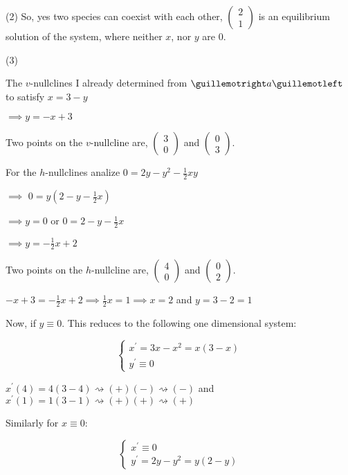 \documentclass{article}
\begin{document}
(2) So, yes two species can coexist with each other, $\begin{pmatrix}
  2\\1\end{pmatrix}$ is an equilibrium solution of the system, where
neither $x$, nor $y$ are $0$.

(3)

The $v$-nullclines I already determined from $\guillemotright a
\guillemotleft$ to satisfy $x = 3 -y$

$\implies y = -x + 3$

Two points on the $v$-nullcline are, $\begin{pmatrix} 3\\0\end{pmatrix}$ and $\begin{pmatrix} 0\\3\end{pmatrix}$.

For the $h$-nullclines analize  $0 = 2y -y^2 -\frac{1}{2}xy $

$\implies $ $0 = y(2 -y -\frac{1}{2}x)$

$\implies y = 0$ or $0 = 2 -y -\frac{1}{2}x$

$\implies y = -\frac{1}{2}x + 2$

Two points on the $h$-nullcline are, $\begin{pmatrix}
  4\\0\end{pmatrix}$ and $\begin{pmatrix} 0\\2\end{pmatrix}$.

$-x + 3 = -\frac{1}{2}x + 2 \implies \frac{1}{2}x =1 \implies x = 2$
and $y = 3-2 = 1$

Now, if $y \equiv 0$. This reduces to the following one dimensional system:

\[\begin{cases}
x^\prime = 3x -x^2 = x(3-x)\\
y^\prime \equiv 0
\end{cases}\]

$x^\prime(4) = 4(3-4)
\rightsquigarrow (+)(-)\rightsquigarrow (-)$
and
$x^\prime(1) = 1(3-1)
    \rightsquigarrow (+)(+)\rightsquigarrow (+)$

Similarly for $x \equiv 0$:

\[\begin{cases}
x^\prime \equiv 0\\
y^\prime = 2y -y^2 = y(2-y)
\end{cases}\]
\end{document}
